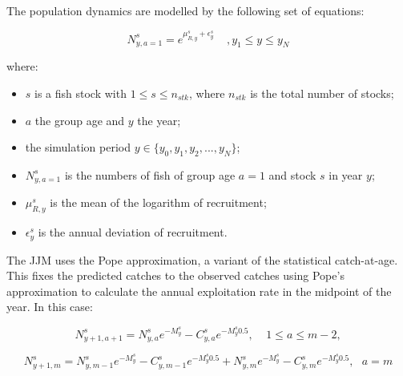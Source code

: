 \documentclass{article}
\begin{document}
The population dynamics are modelled by the following set of equations:

\begin{equation}
N^s_{y,a=1}=e^{\mu_{R,y}^s+\epsilon_{y}^s}  \ \ \ \ \ , y_{1}\leq y \leq y_{N}
\end{equation}

where:
\begin{itemize}
    \item $s$ is a fish stock with $1\leq s \leq n_{stk}$, where $n_{stk}$ is the total number of stocks; 
    \item $a$ the group age and $y$ the year;
    
    \item the simulation period ${y \in \{y_{0}, y_1, y_2,..., y_{N}\}}$;   
  
    \item $N^s_{y,a=1}$ is the numbers of fish of group age $a=1$ and stock $s$ in year $y$;
    
    \item $\mu_{R,y}^s$ is the mean  of the logarithm of recruitment;

    \item $\epsilon_{y}^s$ is the annual deviation of recruitment.
    
\end{itemize}

The JJM uses the Pope approximation, a variant of the statistical catch-at-age. This fixes the predicted catches to the observed catches using Pope's approximation to calculate the annual exploitation rate in the midpoint of the year. In this case:

\begin{equation}
N^{s}_{y+1,a+1}=N^s_{y,a}e^{-M^s_y}-C^s_{y,a}e^{-M^s_y 0.5}, \ \ \ \ \ 1\leq a \leq m-2,
\end{equation}
    
\begin{equation}
N^s_{y+1,m}=N^s_{y,m-1}e^{-M^s_y}-C^s_{y,m-1}e^{-M^s_y 0.5}+N^s_{y,m}e^{-M^s_y}-C^s_{y,m}e^{-M^s_y 0.5}, \ \ \ a = m
\end{equation}
\end{document}
